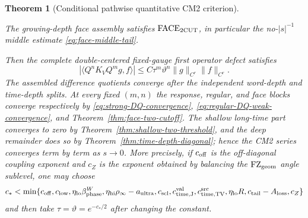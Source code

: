 \documentclass[11pt]{article}
\newtheorem{theorem}{Theorem}[section]
\begin{document}
\begin{theorem}[Conditional pathwise quantitative CM2 criterion]
\begin{enumerate}[label=\textup{(H\arabic*)}]
      The growing-depth face assembly satisfies
      $\mathrm{FACE}_{\rm 2CUT}$, in particular the no-$|s|^{-1}$ middle
      estimate \eqref{eq:face-middle-tail}.
\end{enumerate}
Then the complete double-centered fixed-gauge first operator defect satisfies
\[
 |\langle Q^nK_VQ^mg,f\rangle|
 \le C\tau^m\vartheta^n\|g\|_{C^r}\|f\|_{C^r}.
\]
The assembled difference quotients converge after the independent word-depth
and time-depth splits.  At every fixed $(m,n)$ the response, regular, and face
blocks converge respectively by
\eqref{eq:strong-DQ-convergence},
\eqref{eq:regular-DQ-weak-convergence}, and
Theorem~\ref{thm:face-two-cutoff}.  The shallow long-time part converges to zero by
Theorem~\ref{thm:shallow-two-threshold}, and the deep remainder does so by
Theorem~\ref{thm:time-depth-diagonal}; hence the CM2 series converges term by
term as $s\to0$.  More
precisely, if $c_{\rm off}$ is the off-diagonal coupling exponent and $c_Z$
is the exponent obtained by balancing the $\mathrm{FZ}_{\rm geom}$ angle sublevel, one
may choose
\begin{equation}
\label{eq:final-CM2-exponent}
 c_*<\min\{c_{\rm off},c_{\rm low},
 \eta_{\rm lo}\beta_{\rm phase}^{W},
 \eta_{\rm hi}\rho_\infty-a_{\rm ultra},c_{\rm scl},
 c_{\rm time,J}^{\rm val},c_{\rm time,TV}^{\rm src},\eta_{\rm lo}R,
 c_{\rm tail}-A_{\rm loss},c_Z\}
\end{equation}
and then take $\tau=\vartheta=e^{-c_*/2}$ after changing the constant.
\end{theorem}
\end{document}
